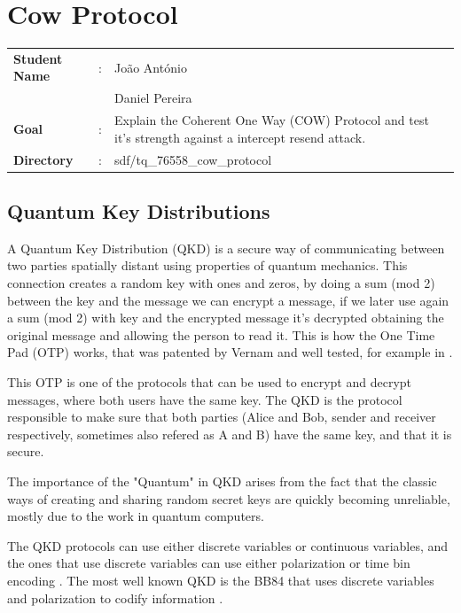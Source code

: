 \clearpage
\section{Cow Protocol}

\begin{refsection}

\begin{tcolorbox}	
\begin{tabular}{p{2.75cm} p{0.2cm} p{10.5cm}} 	
\textbf{Student Name}  &:&  Jo\~ao Ant\'onio\\
\textbf{}  & &  Daniel Pereira\\
\textbf{Goal}          &:& Explain the Coherent One Way (COW) Protocol and test it's strength against a intercept resend attack.\\
\textbf{Directory}     &:& sdf/tq\_76558\_cow\_protocol
\end{tabular}
\end{tcolorbox}

\subsection{Quantum Key Distributions}

A Quantum Key Distribution (QKD) is a secure way of communicating between two parties spatially distant using properties of quantum mechanics. This connection creates a random key with ones and zeros, by doing a sum (mod 2) between the key and the message we can encrypt a message, if we later use again a sum (mod 2) with key and the encrypted message it's decrypted obtaining the original message and allowing the person to read it. This is how the One Time Pad (OTP) works, that was patented by Vernam and well tested, for example in \cite{glover2005one}.

This OTP is one of the protocols that can be used to encrypt and decrypt messages, where both users have the same key. The QKD is the protocol responsible to make sure that both parties (Alice and Bob, sender and receiver respectively, sometimes also refered as A and B) have the same key, and that it is secure.

The importance of the "Quantum" in QKD arises from the fact that the classic ways of creating and sharing random secret keys are quickly becoming unreliable, mostly due to the work in quantum computers.

The QKD protocols can use either discrete variables or continuous variables, and the ones that use discrete variables can use either polarization or time bin encoding \cite{singh2014quantum}. The most well known QKD is the BB84 that uses discrete variables and polarization to codify information \cite{bennett1984advances}.


\end{refsection}

